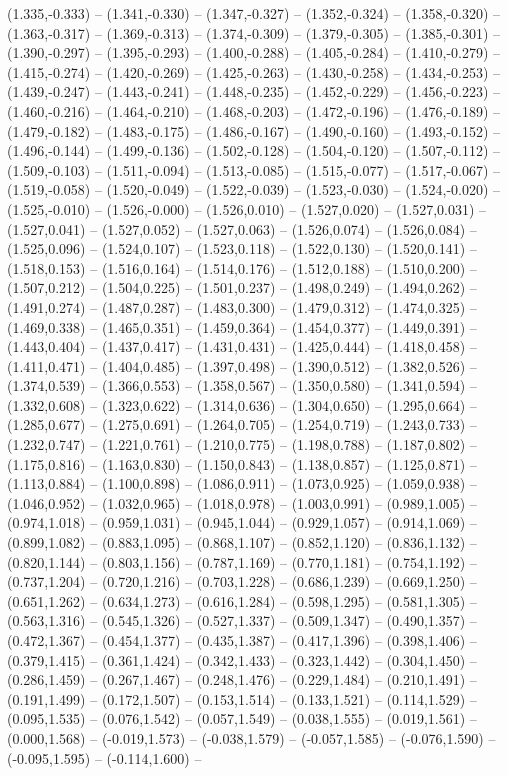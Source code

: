 (1.335,-0.333) -- (1.341,-0.330) -- (1.347,-0.327) -- (1.352,-0.324) -- (1.358,-0.320) -- (1.363,-0.317) -- (1.369,-0.313) -- (1.374,-0.309) -- (1.379,-0.305) -- (1.385,-0.301) -- (1.390,-0.297) -- (1.395,-0.293) -- (1.400,-0.288) -- (1.405,-0.284) -- (1.410,-0.279) -- (1.415,-0.274) -- (1.420,-0.269) -- (1.425,-0.263) -- (1.430,-0.258) -- (1.434,-0.253) -- (1.439,-0.247) -- (1.443,-0.241) -- (1.448,-0.235) -- (1.452,-0.229) -- (1.456,-0.223) -- (1.460,-0.216) -- (1.464,-0.210) -- (1.468,-0.203) -- (1.472,-0.196) -- (1.476,-0.189) -- (1.479,-0.182) -- (1.483,-0.175) -- (1.486,-0.167) -- (1.490,-0.160) -- (1.493,-0.152) -- (1.496,-0.144) -- (1.499,-0.136) -- (1.502,-0.128) -- (1.504,-0.120) -- (1.507,-0.112) -- (1.509,-0.103) -- (1.511,-0.094) -- (1.513,-0.085) -- (1.515,-0.077) -- (1.517,-0.067) -- (1.519,-0.058) -- (1.520,-0.049) -- (1.522,-0.039) -- (1.523,-0.030) -- (1.524,-0.020) -- (1.525,-0.010) -- (1.526,-0.000) -- (1.526,0.010) -- (1.527,0.020) -- (1.527,0.031) -- (1.527,0.041) -- (1.527,0.052) -- (1.527,0.063) -- (1.526,0.074) -- (1.526,0.084) -- (1.525,0.096) -- (1.524,0.107) -- (1.523,0.118) -- (1.522,0.130) -- (1.520,0.141) -- (1.518,0.153) -- (1.516,0.164) -- (1.514,0.176) -- (1.512,0.188) -- (1.510,0.200) -- (1.507,0.212) -- (1.504,0.225) -- (1.501,0.237) -- (1.498,0.249) -- (1.494,0.262) -- (1.491,0.274) -- (1.487,0.287) -- (1.483,0.300) -- (1.479,0.312) -- (1.474,0.325) -- (1.469,0.338) -- (1.465,0.351) -- (1.459,0.364) -- (1.454,0.377) -- (1.449,0.391) -- (1.443,0.404) -- (1.437,0.417) -- (1.431,0.431) -- (1.425,0.444) -- (1.418,0.458) -- (1.411,0.471) -- (1.404,0.485) -- (1.397,0.498) -- (1.390,0.512) -- (1.382,0.526) -- (1.374,0.539) -- (1.366,0.553) -- (1.358,0.567) -- (1.350,0.580) -- (1.341,0.594) -- (1.332,0.608) -- (1.323,0.622) -- (1.314,0.636) -- (1.304,0.650) -- (1.295,0.664) -- (1.285,0.677) -- (1.275,0.691) -- (1.264,0.705) -- (1.254,0.719) -- (1.243,0.733) -- (1.232,0.747) -- (1.221,0.761) -- (1.210,0.775) -- (1.198,0.788) -- (1.187,0.802) -- (1.175,0.816) -- (1.163,0.830) -- (1.150,0.843) -- (1.138,0.857) -- (1.125,0.871) -- (1.113,0.884) -- (1.100,0.898) -- (1.086,0.911) -- (1.073,0.925) -- (1.059,0.938) -- (1.046,0.952) -- (1.032,0.965) -- (1.018,0.978) -- (1.003,0.991) -- (0.989,1.005) -- (0.974,1.018) -- (0.959,1.031) -- (0.945,1.044) -- (0.929,1.057) -- (0.914,1.069) -- (0.899,1.082) -- (0.883,1.095) -- (0.868,1.107) -- (0.852,1.120) -- (0.836,1.132) -- (0.820,1.144) -- (0.803,1.156) -- (0.787,1.169) -- (0.770,1.181) -- (0.754,1.192) -- (0.737,1.204) -- (0.720,1.216) -- (0.703,1.228) -- (0.686,1.239) -- (0.669,1.250) -- (0.651,1.262) -- (0.634,1.273) -- (0.616,1.284) -- (0.598,1.295) -- (0.581,1.305) -- (0.563,1.316) -- (0.545,1.326) -- (0.527,1.337) -- (0.509,1.347) -- (0.490,1.357) -- (0.472,1.367) -- (0.454,1.377) -- (0.435,1.387) -- (0.417,1.396) -- (0.398,1.406) -- (0.379,1.415) -- (0.361,1.424) -- (0.342,1.433) -- (0.323,1.442) -- (0.304,1.450) -- (0.286,1.459) -- (0.267,1.467) -- (0.248,1.476) -- (0.229,1.484) -- (0.210,1.491) -- (0.191,1.499) -- (0.172,1.507) -- (0.153,1.514) -- (0.133,1.521) -- (0.114,1.529) -- (0.095,1.535) -- (0.076,1.542) -- (0.057,1.549) -- (0.038,1.555) -- (0.019,1.561) -- (0.000,1.568) -- (-0.019,1.573) -- (-0.038,1.579) -- (-0.057,1.585) -- (-0.076,1.590) -- (-0.095,1.595) -- (-0.114,1.600) -- 
